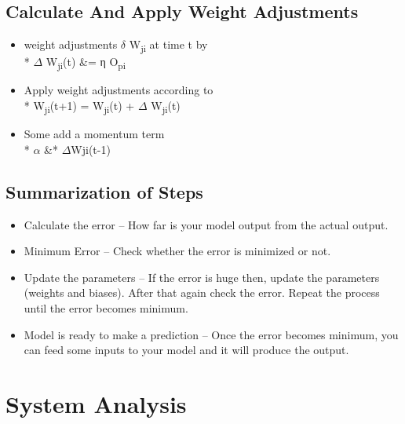 \subsection{Calculate And Apply Weight Adjustments}
\begin{itemize}
    \item weight adjustments $\delta$ W\textsubscript{ji} at time t by\\*
     $\Delta$ W\textsubscript{ji}(t) &= η \partialj O\textsubscript{pi}

    \item Apply weight adjustments according to\\*
W\textsubscript{ji}(t+1) = W\textsubscript{ji}(t) + $\Delta$ W\textsubscript{ji}(t)

    \item Some add a momentum term \\* $\alpha$ &* $\Delta$Wji(t-1)
    
\end{itemize}



  
  \subsection{Summarization of Steps}
\begin{itemize}
\item Calculate the error – How far is your model output from the actual output.
\item Minimum Error – Check whether the error is minimized or not.
\item Update the parameters – If the error is huge then, update the parameters (weights and biases). After that again check the error. Repeat the process until the error becomes minimum.
\item  Model is ready to make a prediction – Once the error becomes minimum, you can feed some inputs to your model and it will produce the output.
  \end{itemize}
  

 
\section{System Analysis}

